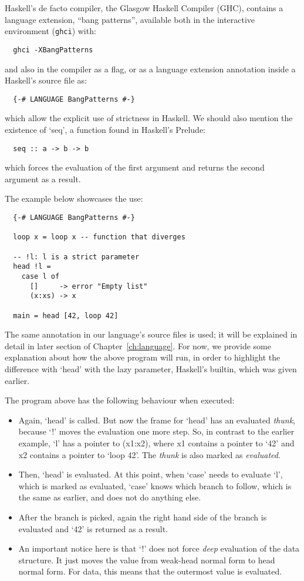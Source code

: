\documentclass[diploma]{softlab-thesis}
\begin{document}
Haskell's de facto compiler, the Glasgow Haskell Compiler (GHC),
contains a language extension, ``bang patterns'', available both in
the interactive environment (\texttt{ghci}) with:
\begin{verbatim}
  ghci -XBangPatterns
\end{verbatim}
and also in the compiler as a flag, or as a language extension annotation inside a Haskell's source file as:
\begin{verbatim}
  {-# LANGUAGE BangPatterns #-}
\end{verbatim}
which allow the explicit use of strictness in Haskell. We should also mention the existence of `seq', a function found
in Haskell's Prelude:
\begin{verbatim}
  seq :: a -> b -> b
\end{verbatim}
which forces the evaluation of the first argument and returns the second argument as a result.

The example below showcases the use:
\begin{verbatim}
  {-# LANGUAGE BangPatterns #-}

  loop x = loop x -- function that diverges

  -- !l: l is a strict parameter
  head !l = 
    case l of 
      []     -> error "Empty list"
      (x:xs) -> x

  main = head [42, loop 42]
\end{verbatim}

The same annotation in our language's source files is used; it will be explained in detail in later section of 
Chapter~\ref{ch:language}. For now, we provide some explanation about how the above program will run, in order to highlight 
the difference with `head' with the lazy parameter, Haskell's builtin, which was given earlier. 

The program above has the following behaviour when executed:
\begin{itemize}
  \item Again, `head' is called. But now the frame for `head' has an evaluated \textit{thunk}, because `!' moves the 
  evaluation one more step. So, in contrast to the earlier example, `l' has a pointer to (x1:x2), where x1 contains a pointer to 
  `42' and x2 contains a pointer to `loop 42'. The \textit{thunk} is also marked as \textit{evaluated}.
  \item Then, `head' is evaluated. At this point, when `case' needs to evaluate `l', which is marked as evaluated, `case' knows 
  which branch to follow, which is the same as earlier, and does not do anything else.
  \item After the branch is picked, again the right hand side of the branch is evaluated and `42' is returned as a result.
  \item An important notice here is that `!' does not force \textit{deep} evaluation of the data structure. It just moves the 
  value from weak-head normal form to head normal form. For data, this means that the outermost value is evaluated.
\end{itemize}
\end{document}
